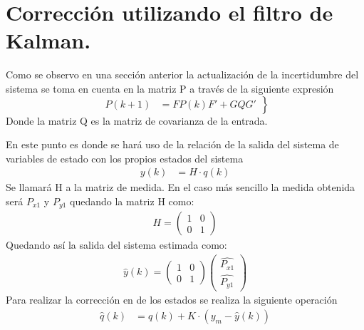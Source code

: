 \section{Corrección utilizando el filtro de Kalman.}
Como se observo en una sección anterior la actualización de la incertidumbre del sistema se toma en cuenta en la matriz P a través de la siguiente expresión 
\begin{equation*}
\left.
 \begin{aligned}
P(k+1)&=FP(k)F'+GQG'
\end{aligned}
\right\}
\end{equation*}
Donde la matriz Q es la matriz de covarianza de la entrada.
\par
En este punto es donde se hará uso de la relación de la salida del sistema de variables de estado con los propios estados del sistema 
\begin{equation*}
\left.
 \begin{aligned}
y(k)&=H\cdot{q(k)}
\end{aligned}
\right.
\end{equation*}
Se llamará H a la matriz de medida. En el caso más sencillo la medida obtenida será $P_{x1}$ y $P_{y1}$ quedando la matriz H como:
\begin{equation*}
\left.
 \begin{aligned}
H=\begin{pmatrix}
1 & 0\\
0 & 1 
\end{pmatrix}
\end{aligned}
\right.
\end{equation*}
Quedando así la salida del sistema estimada como:
\begin{equation*}
\left.
 \begin{aligned}
\hat{y}(k)=\begin{pmatrix}
1 & 0\\
0 & 1 
\end{pmatrix}\begin{pmatrix}
\hat{P_{x1}}\\
\hat{P_{y1}} 
\end{pmatrix}
\end{aligned}
\right.
\end{equation*}
Para realizar la corrección en de los estados se realiza la siguiente operación 
\begin{equation*}
\left.
 \begin{aligned}
\hat{q}(k)&=\hat{q}(k)+K\cdot{(y_{m}-\hat{y}(k))}
\end{aligned}
\right.
\end{equation*}
